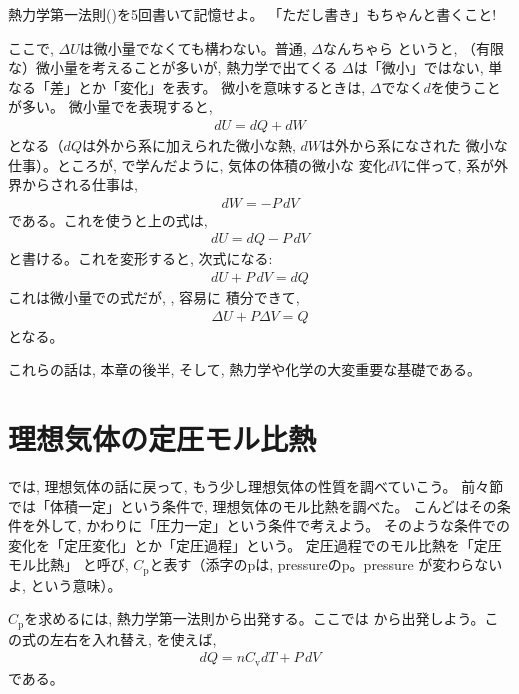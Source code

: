 \begin{q}\label{q:themlaw1} 熱力学第一法則()を5回書いて記憶せよ。
「ただし書き」もちゃんと書くこと!\end{q}\mv

ここで, $\Delta U$は微小量でなくても構わない。普通, $\Delta$なんちゃら
というと, （有限な）微小量を考えることが多いが, 熱力学で出てくる
$\Delta$は「微小」ではない, 単なる「差」とか「変化」を表す。
微小を意味するときは, $\Delta$でなく$d$を使うことが多い。
微小量でを表現すると, 
\begin{eqnarray}
dU=dQ+dW\label{eq:thermlaw1inf}
\end{eqnarray}
となる（$dQ$は外から系に加えられた微小な熱, $dW$は外から系になされた
微小な仕事）。ところが, で学んだように, 気体の体積の微小な
変化$dV$に伴って, 系が外界からされる仕事は, 
\begin{eqnarray}dW=-P\,dV\end{eqnarray}
である。これを使うと上の式は, 
\begin{eqnarray}
dU=dQ-P\,dV\label{/eq:thermlaw1infPdV}
\end{eqnarray}
と書ける。これを変形すると, 次式になる: 
\begin{eqnarray}
dU+P\,dV=dQ\label{eq:thermlaw1infPdV2}
\end{eqnarray}
これは微小量での式だが, , 容易に
積分できて, 
\begin{eqnarray}
\Delta U+P\Delta V=Q\label{eq:thermlaw1infPdV3}
\end{eqnarray}
となる。

これらの話は, 本章の後半, そして, 熱力学や化学の大変重要な基礎である。\\


\section{理想気体の定圧モル比熱}

では, 理想気体の話に戻って, もう少し理想気体の性質を調べていこう。
前々節では「体積一定」という条件で, 理想気体のモル比熱を調べた。
こんどはその条件を外して, かわりに「圧力一定」という条件で考えよう。
そのような条件での変化を「定圧変化」とか「定圧過程」という。
定圧過程でのモル比熱を「定圧モル比熱」
と呼び, $C_{\text{p}}$と表す（添字のpは, pressureのp。pressure
が変わらないよ, という意味）。

$C_{\text{p}}$を求めるには, 熱力学第一法則から出発する。ここでは
から出発しよう。この式の左右を入れ替え, 
を使えば, 
\begin{eqnarray}
dQ=nC_{\text{v}}dT+P\,dV
\end{eqnarray}
である。

